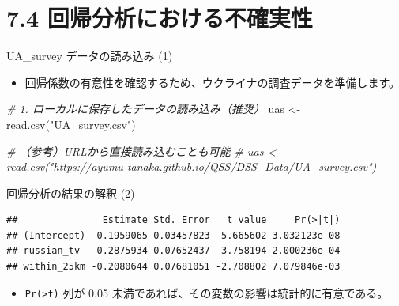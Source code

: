\documentclass[
  ignorenonframetext,
]{beamer}
\newenvironment{Shaded}{\begin{snugshade}}{\end{snugshade}}
\newcommand{\AttributeTok}[1]{\textcolor[rgb]{0.77,0.63,0.00}{#1}}
\newcommand{\CommentTok}[1]{\textcolor[rgb]{0.56,0.35,0.01}{\textit{#1}}}
\newcommand{\FunctionTok}[1]{\textcolor[rgb]{0.00,0.00,0.00}{#1}}
\newcommand{\NormalTok}[1]{#1}
\newcommand{\OtherTok}[1]{\textcolor[rgb]{0.56,0.35,0.01}{#1}}
\newcommand{\SpecialCharTok}[1]{\textcolor[rgb]{0.00,0.00,0.00}{#1}}
\newcommand{\StringTok}[1]{\textcolor[rgb]{0.31,0.60,0.02}{#1}}
\providecommand{\tightlist}{%
  \setlength{\itemsep}{0pt}\setlength{\parskip}{0pt}}
\begin{document}
\hypertarget{ux56deux5e30ux5206ux6790ux306bux304aux3051ux308bux4e0dux78baux5b9fux6027}{%
\section{7.4
回帰分析における不確実性}\label{ux56deux5e30ux5206ux6790ux306bux304aux3051ux308bux4e0dux78baux5b9fux6027}}

\begin{frame}[fragile]{UA\_survey データの読み込み (1)}
\protect\hypertarget{ua_survey-ux30c7ux30fcux30bfux306eux8aadux307fux8fbcux307f-1}{}
\begin{itemize}
\tightlist
\item
  回帰係数の有意性を確認するため、ウクライナの調査データを準備します。
\end{itemize}

\scriptsize

\begin{Shaded}
\begin{Highlighting}[]
\CommentTok{\# 1. ローカルに保存したデータの読み込み（推奨）}
\NormalTok{uas }\OtherTok{\textless{}{-}} \FunctionTok{read.csv}\NormalTok{(}\StringTok{"UA\_survey.csv"}\NormalTok{)}

\CommentTok{\# （参考）URLから直接読み込むことも可能}
\CommentTok{\# uas \textless{}{-} read.csv("https://ayumu{-}tanaka.github.io/QSS/DSS\_Data/UA\_survey.csv")}
\end{Highlighting}
\end{Shaded}

\normalsize
\end{frame}

\begin{frame}[fragile]{回帰分析の結果の解釈 (2)}
\protect\hypertarget{ux56deux5e30ux5206ux6790ux306eux7d50ux679cux306eux89e3ux91c8-2}{}
\scriptsize

\begin{Shaded}
\end{Shaded}

\begin{verbatim}
##               Estimate Std. Error   t value     Pr(>|t|)
## (Intercept)  0.1959065 0.03457823  5.665602 3.032123e-08
## russian_tv   0.2875934 0.07652437  3.758194 2.000236e-04
## within_25km -0.2080644 0.07681051 -2.708802 7.079846e-03
\end{verbatim}

\normalsize

\begin{itemize}
\tightlist
\item
  \texttt{Pr(\textgreater{}\textbar{}t\textbar{})} 列が 0.05
  未満であれば、その変数の影響は統計的に有意である。
\end{itemize}
\end{frame}
\end{document}
